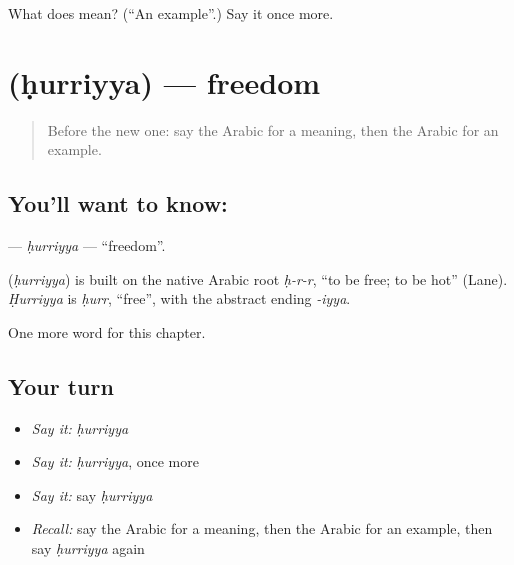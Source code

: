 \begin{tcolorbox}[breakable,colback=teal!4,colframe=teal!35!black,title={Before you move on}]
What does  mean? (\textquotedblleft{}An example\textquotedblright{}.) Say it once more.
\end{tcolorbox}
\section[\texorpdfstring{\ar{حرية} (ḥurriyya)}{حرية (ḥurriyya)}]{ (ḥurriyya) — freedom}

\label{lesson:AR-C208-hurriyya}



\begin{quote}
Before the new one: say the Arabic for a meaning, then the Arabic for an example.
\end{quote}

\subsection*{You'll want to know: }
\textbf{} — \emph{ḥurriyya} — \textquotedblleft{}freedom\textquotedblright{}.

\begin{cousinweb}
\textbf{} (\emph{ḥurriyya}) is built on the native Arabic root \emph{ḥ-r-r}, \textquotedblleft{}to be free; to be hot\textquotedblright{} (Lane). \emph{Ḥurriyya} is \emph{ḥurr}, \textquotedblleft{}free\textquotedblright{}, with the abstract ending \emph{-iyya}.
\end{cousinweb}

\begin{grammarlens}[title={What you've built}]
One more word for this chapter.
\end{grammarlens}

\subsection*{Your turn}
\begin{itemize}
\raggedright
  \item \emph{Say it:} \emph{ḥurriyya}
  \item \emph{Say it:} \emph{ḥurriyya}, once more
  \item \emph{Say it:} say \emph{ḥurriyya}
  \item \emph{Recall:} say the Arabic for a meaning, then the Arabic for an example, then say \emph{ḥurriyya} again
\end{itemize}

